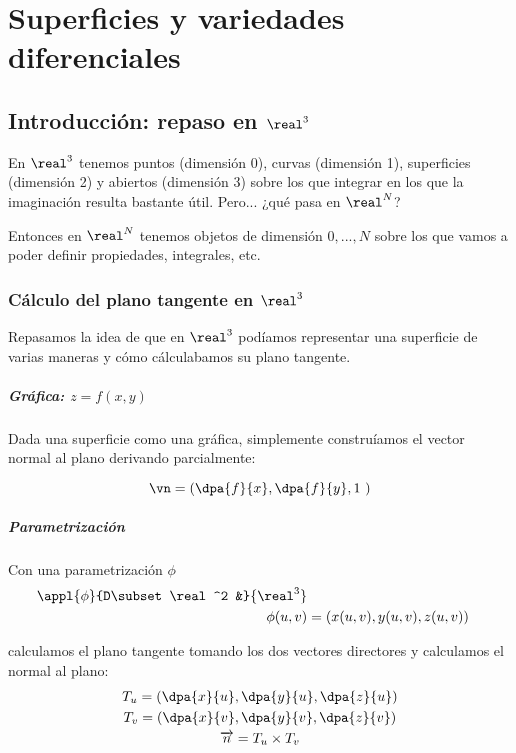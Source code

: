 \chapter{Superficies y variedades diferenciales}
  
  \section{Introducción: repaso en $\real^3$}
  
  En $\real^3$ tenemos puntos (dimensión 0), curvas (dimensión 1), superficies (dimensión 2) y abiertos (dimensión 3) sobre los que integrar en los que la imaginación resulta bastante útil. Pero... ¿qué pasa en $\real^N$? 
  
  Entonces en $\real^N$ tenemos objetos de dimensión $0,...,N$ sobre los que vamos a poder definir propiedades, integrales, etc.
  
\subsection{Cálculo del plano tangente en $\real^3$}  
  
  Repasamos la idea de que en $\real^3$ podíamos representar una superficie de varias maneras y cómo cálculabamos su plano tangente.
  \paragraph{Gráfica: $z=f(x,y)$} Dada una superficie como una gráfica, simplemente construíamos el vector normal al plano derivando parcialmente:
  
  \[ \vn = \left( \dpa{f}{x},\dpa{f}{y}, 1 \right) \]
  \paragraph{Parametrización}  Con una parametrización $\phi$ 
   	 \begin{align*}
  	 	\appl{\phi}{D\subset\real^2 &}{\real^3} \\     
     	\phi(u,v) &= (x(u,v),y(u,v),z(u,v))
     \end{align*}
  
     calculamos el plano tangente tomando los dos vectores directores y calculamos el normal al plano:
     \begin{gather*}
      	T_u = \left( \dpa{x}{u},\dpa{y}{u},\dpa{z}{u}\right)\\
      	T_v = \left( \dpa{x}{v},\dpa{y}{v},\dpa{z}{v}\right)\\
      	\overrightarrow{n} = T_u\times T_v\\
     \end{gather*}

